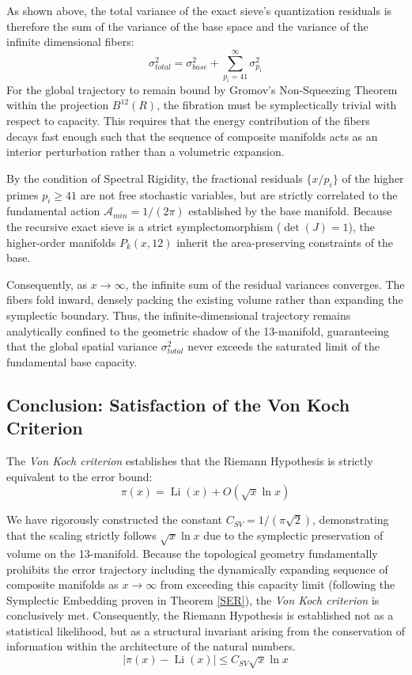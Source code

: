 \documentclass[sn-mathphys-num, pdflatex]{sn-jnl}
\begin{document}
As shown above, the total variance of the exact sieve's quantization residuals is therefore the sum of the variance of the base space and the variance of the infinite dimensional fibers:
\begin{equation}
\sigma_{total}^2 = \sigma_{base}^2 + \sum_{p_i = 41}^{\infty} \sigma_{p_i}^2
\end{equation}
For the global trajectory to remain bound by Gromov's Non-Squeezing Theorem within the projection $B^{12}(R)$, the fibration must be symplectically trivial with respect to capacity. This requires that the energy contribution of the fibers decays fast enough such that the sequence of composite manifolds acts as an interior perturbation rather than a volumetric expansion.

By the condition of Spectral Rigidity, the fractional residuals $\{x/p_i\}$ of the higher primes $p_i \ge 41$ are not free stochastic variables, but are strictly correlated to the fundamental action $\mathcal{A}_{min} = 1/(2\pi)$ established by the base manifold. Because the recursive exact sieve is a strict symplectomorphism ($\det(J)=1$), the higher-order manifolds $P_k(x,12)$ inherit the area-preserving constraints of the base. 

Consequently, as $x \rightarrow \infty$, the infinite sum of the residual variances converges. The fibers fold inward, densely packing the existing volume rather than expanding the symplectic boundary. Thus, the infinite-dimensional trajectory remains analytically confined to the geometric shadow of the 13-manifold, guaranteeing that the global spatial variance $\sigma_{total}^2$ never exceeds the saturated limit of the fundamental base capacity.

\subsection{Conclusion: Satisfaction of the Von Koch Criterion}
\label{VC}

The \textit{Von Koch criterion} \cite{vonkoch} establishes that the Riemann Hypothesis is strictly equivalent to the error bound:
\begin{equation}
\label{eq:VC}
\pi(x) = \operatorname{Li}(x) + O(\sqrt{x} \ln x)
\end{equation}

We have rigorously constructed the constant $C_{SV} = 1/(\pi\sqrt{2})$, demonstrating that the scaling strictly follows $\sqrt{x} \ln x$ due to the symplectic preservation of volume on the 13-manifold. Because the topological geometry fundamentally prohibits the error trajectory including the dynamically expanding sequence of composite manifolds as $x \to \infty$ from exceeding this capacity limit (following the Symplectic Embedding proven in Theorem \ref{SER}), the \textit{Von Koch criterion} is conclusively met. Consequently, the Riemann Hypothesis is established not as a statistical likelihood, but as a structural invariant arising from the conservation of information within the architecture of the natural numbers.
\begin{equation}
\label{thm:bound}
|\pi(x) - \operatorname{Li}(x)| \le C_{SV} \sqrt{x} \ln x
\end{equation}
\end{document}
